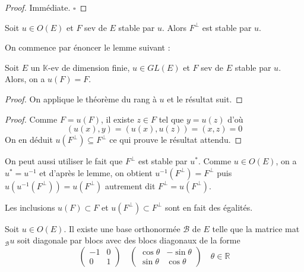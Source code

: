 \begin{proof}

Immédiate. \hfill $\square$

\end{proof}

\begin{proposition}
\label{prop:23}

Soit $u \in O(E)$ et $F$ sev de $E$ stable par $u$. Alors $F^\perp$ est stable par $u$.

On commence par énoncer le lemme suivant :

\end{proposition}

\begin{lemma}
\label{lem:1}

Soit $E$ un $\mathbb{K}$-ev de dimension finie, $u \in GL(E)$ et $F$ sev de $E$ stable par $u$. Alors, on a $u(F) = F$.

\end{lemma}

\begin{proof}

On applique le théorème du rang à $u$ et le résultat suit.

\end{proof}

\begin{proof}

Comme $F = u(F)$, il existe $z \in F$ tel que $y = u(z)$ d'où
\[ (u(x), y) = (u(x), u(z)) = (x, z) = 0 \]
On en déduit $u(F^\perp) \subseteq F^\perp$ ce qui prouve le résultat attendu.

\end{proof}

\begin{remark}

On peut aussi utiliser le fait que $F^\perp$ est stable par $u^\ast$. Comme $u \in O(E)$, on a $u^\ast = u^{-1}$ et d'après le lemme, on obtient $u^{-1}(F^\perp) = F^\perp$ puis $u(u^{-1}(F^\perp)) = u(F^\perp)$ autrement dit $F^\perp = u(F^\perp)$.

\end{remark}

\begin{remark}

Les inclusions $u(F) \subset F$ et $u(F^\perp) \subset F^\perp$ sont en fait des égalités.

\end{remark}

\begin{theorem}
\label{thm:9}

Soit $u \in O(E)$. Il existe une base orthonormée $\mathcal{B}$ de $E$ telle que la matrice mat$_\mathcal{B} u$ soit diagonale par blocs avec des blocs diagonaux de la forme
\[ \begin{pmatrix} -1 & 0 \\ 0 & 1 \end{pmatrix} \quad \begin{pmatrix} \cos \theta & -\sin \theta \\ \sin \theta & \cos \theta \end{pmatrix} \quad \theta \in \mathbb{R} \]

\end{theorem}

